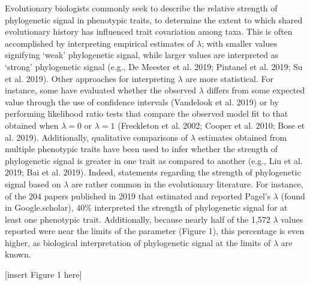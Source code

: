 \documentclass[
]{article}
\begin{document}
Evolutionary biologists commonly seek to describe the relative strength
of phylogenetic signal in phenotypic traits, to determine the extent to
which shared evolutionary history has influenced trait covariation among
taxa. This is often accomplished by interpreting empirical estimates of
\(\lambda\); with smaller values signifying `weak' phylogenetic signal,
while larger values are interpreted as `strong' phylogenetic signal
(e.g., De Meester et al. 2019; Pintanel et al. 2019; Su et al. 2019).
Other approaches for interpreting \(\lambda\) are more statistical. For
instance, some have evaluated whether the observed \(\lambda\) differs
from some expected value through the use of confidence intervals
(Vandelook et al. 2019) or by performing likelihood ratio tests that
compare the observed model fit to that obtained when \(\lambda=0\) or
\(\lambda=1\) (Freckleton et al. 2002; Cooper et al. 2010; Bose et al.
2019). Additionally, qualitative comparisons of \(\lambda\) estimates
obtained from multiple phenotypic traits have been used to infer whether
the strength of phylogenetic signal is greater in one trait as compared
to another (e.g., Liu et al. 2019; Bai et al. 2019). Indeed, statements
regarding the strength of phylogenetic signal based on \(\lambda\) are
rather common in the evolutionary literature. For instance, of the 204
papers published in 2019 that estimated and reported Pagel's \(\lambda\)
(found in Google.scholar), 40\% interpreted the strength of phylogenetic
signal for at least one phenotypic trait. Additionally, because nearly
half of the 1,572 \(\lambda\) values reported were near the limits of
the parameter (Figure 1), this percentage is even higher, as biological
interpretation of phylogenetic signal at the limits of \(\lambda\) are
known. \hfill\break

{[}insert Figure 1 here{]} \hfill\break
\end{document}
